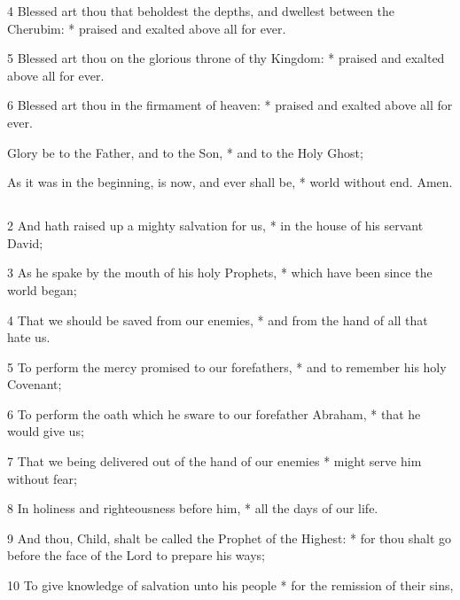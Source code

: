 4 Blessed art thou that beholdest the depths, and dwellest between the Cherubim: * praised and exalted above all for ever.

5 Blessed art thou on the glorious throne of thy Kingdom: * praised and exalted above all for ever.

6 Blessed art thou in the firmament of heaven: * praised and exalted above all for ever.

Glory be to the Father, and to the Son, * and to the Holy Ghost;

As it was in the beginning, is now, and ever shall be, * world without end. Amen.

\subsubsection{}


\subsection{}


2 And hath raised up a mighty salvation for us, * in the house of his servant David;

3 As he spake by the mouth of his holy Prophets, * which have been since the world began;

4 That we should be saved from our enemies, * and from the hand of all that hate us.

5 To perform the mercy promised to our forefathers, * and to remember his holy Covenant;

6 To perform the oath which he sware to our forefather Abraham, * that he would give us;

7 That we being delivered out of the hand of our enemies * might serve him without fear;

8 In holiness and righteousness before him, * all the days of our life.

9 And thou, Child, shalt be called the Prophet of the Highest: * for thou shalt go before the face of the Lord to prepare his ways;

10 To give knowledge of salvation unto his people * for the remission of their sins,

